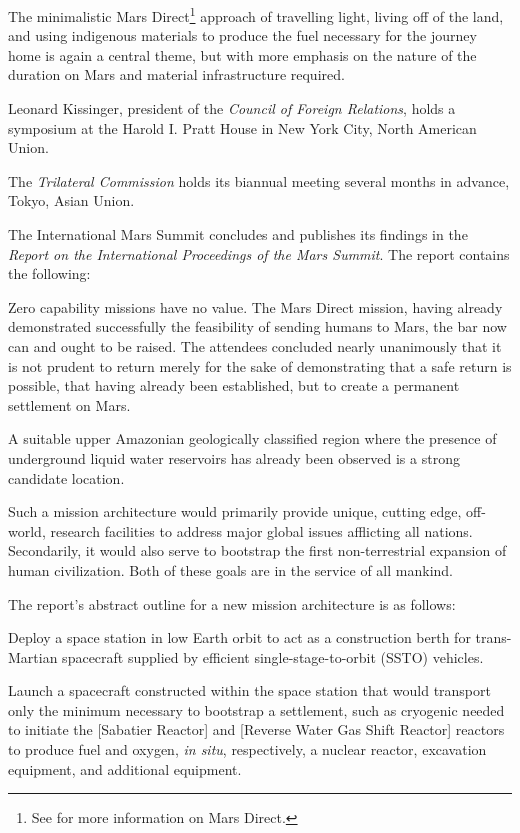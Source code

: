 The minimalistic Mars Direct\footnote{See  for more information on Mars Direct.} approach of travelling light, living off of the land, and using indigenous materials to produce the fuel necessary for the journey home is again a central theme, but with more emphasis on the nature of the duration on Mars and material infrastructure required.
\StopTimelineDate

Leonard Kissinger, president of the {\it Council of Foreign Relations}, holds a symposium at the Harold I. Pratt House in New York City, North American Union.
\StopTimelineDate

The {\it Trilateral Commission} holds its biannual meeting several months in advance, Tokyo, Asian Union.
\StopTimelineDate

The International Mars Summit concludes and publishes its findings in the {\it Report on the International Proceedings of the Mars Summit}. The report contains the following:

\startTimelineDocument
Zero capability missions have no value. The Mars Direct mission, having already demonstrated successfully the feasibility of sending humans to Mars, the bar now can and ought to be raised. The attendees concluded nearly unanimously that it is not prudent to return merely for the sake of demonstrating that a safe return is possible, that having already been established, but to create a permanent settlement on Mars. 

A suitable upper Amazonian geologically classified region where the presence of underground liquid water reservoirs has already been observed is a strong candidate location. 

Such a mission architecture would primarily provide unique, cutting edge, off-world, research facilities to address major global issues afflicting all nations. Secondarily, it would also serve to bootstrap the first non-terrestrial expansion of human civilization. Both of these goals are in the service of all mankind.
\stopTimelineDocument

The report's abstract outline for a new mission architecture is as follows:

\startitemize[n]
\item Deploy a space station in low Earth orbit to act as a construction berth for trans-Martian spacecraft supplied by efficient single-stage-to-orbit (SSTO) vehicles.

\item Launch a spacecraft constructed within the space station that would transport only the minimum necessary to bootstrap a settlement, such as cryogenic  needed to initiate the [Sabatier Reactor] and [Reverse Water Gas Shift Reactor] reactors to produce fuel and oxygen, {\it in situ}, respectively, a nuclear reactor, excavation equipment, and additional equipment.

